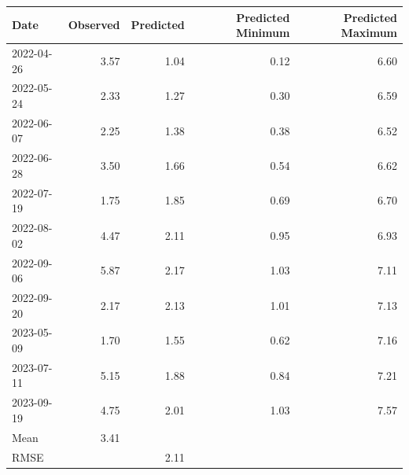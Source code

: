 \begin{table}[ht]
\centering
\begin{tabular}{lrrrr}
  \hline
Date & Observed & Predicted & Predicted Minimum & Predicted Maximum \\ 
  \hline
2022-04-26 & 3.57 & 1.04 & 0.12 & 6.60 \\ 
  2022-05-24 & 2.33 & 1.27 & 0.30 & 6.59 \\ 
  2022-06-07 & 2.25 & 1.38 & 0.38 & 6.52 \\ 
  2022-06-28 & 3.50 & 1.66 & 0.54 & 6.62 \\ 
  2022-07-19 & 1.75 & 1.85 & 0.69 & 6.70 \\ 
  2022-08-02 & 4.47 & 2.11 & 0.95 & 6.93 \\ 
  2022-09-06 & 5.87 & 2.17 & 1.03 & 7.11 \\ 
  2022-09-20 & 2.17 & 2.13 & 1.01 & 7.13 \\ 
  2023-05-09 & 1.70 & 1.55 & 0.62 & 7.16 \\ 
  2023-07-11 & 5.15 & 1.88 & 0.84 & 7.21 \\ 
  2023-09-19 & 4.75 & 2.01 & 1.03 & 7.57 \\ 
  Mean & 3.41 &  &  &  \\ 
  RMSE &  & 2.11 &  &  \\ 
   \hline
\end{tabular}
\end{table}
